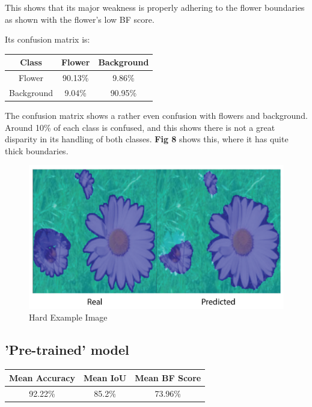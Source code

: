 \documentclass{article}
\begin{document}
This shows that its major weakness is properly adhering to the flower boundaries as shown with the flower's low BF score.

Its confusion matrix is:

\begin{center}
    \begin{tabular}{| c |c | c |} 
     \hline
    Class  & Flower & Background \\ [0.5ex] 
     \hline
     Flower & 90.13\% & 9.86\% \\ 
     \hline
     Background & 9.04\% & 90.95\%\\ 
     \hline
    \end{tabular}
\end{center}

The confusion matrix shows a rather even confusion with flowers and background. Around 10\% of each class is confused, and this shows there is not a great disparity in its handling of both classes. \textbf{Fig 8} shows this, where it has quite thick boundaries.

\begin{figure}[H]
    \centering
    \includegraphics[width=\linewidth]{fromscratchexample.png}
    \caption{Hard Example Image}
\end{figure} 

\subsection{'Pre-trained' model}
\label{sec:print}


\begin{center}
    \begin{tabular}{|c | c  | c |} 
     \hline
     Mean Accuracy & Mean IoU & Mean BF Score \\ [0.5ex] 
     \hline
     92.22\% & 85.2\% & 73.96\% \\ 
     \hline
    \end{tabular}
\end{center}
\end{document}
